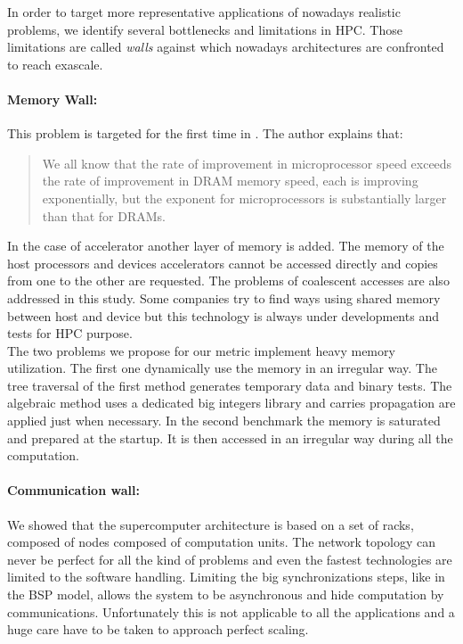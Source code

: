 In order to target more representative applications of nowadays realistic problems, we identify several bottlenecks and limitations in HPC. 
Those limitations are called \textit{walls} against which nowadays architectures are confronted to reach exascale. 

\paragraph{Memory Wall: }
This problem is targeted for the first time in \cite{wulf1995hitting}.
The author explains that:
\begin{quotation} We all know that the rate of improvement in microprocessor speed exceeds the rate of improvement in DRAM memory speed, each is improving exponentially, but the exponent for microprocessors is substantially larger than that for DRAMs.
\end{quotation}
In the case of accelerator another layer of memory is added. 
The memory of the host processors and devices accelerators cannot be accessed directly and copies from one to the other are requested.
The problems of coalescent accesses are also addressed in this study.
Some companies try to find ways using shared memory between host and device but this technology is always under developments and tests for HPC purpose. \\

The two problems we propose for our metric implement heavy memory utilization. 
The first one dynamically use the memory in an irregular way. 
The tree traversal of the first method generates temporary data and binary tests. 
The algebraic method uses a dedicated big integers library and carries propagation are applied just when necessary. 
In the second benchmark the memory is saturated and prepared at the startup.
It is then accessed in an irregular way during all the computation. 

\paragraph{Communication wall: } 
We showed that the supercomputer architecture is based on a set of racks, composed of nodes composed of computation units. 
The network topology can never be perfect for all the kind of problems and even the fastest technologies are limited to the software handling. 
Limiting the big synchronizations steps, like in the BSP model, allows the system to be asynchronous and hide computation by communications. 
Unfortunately this is not applicable to all the applications and a huge care have to be taken to approach perfect scaling.\\

